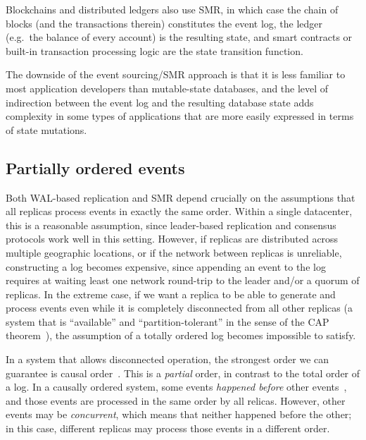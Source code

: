 \documentclass[sigconf,nonacm]{acmart}
\begin{document}
Blockchains and distributed ledgers also use SMR, in which case the chain of blocks (and the transactions therein) constitutes the event log, the ledger (e.g.\ the balance of every account) is the resulting state, and smart contracts or built-in transaction processing logic are the state transition function.

The downside of the event sourcing/SMR approach is that it is less familiar to most application developers than mutable-state databases, and the level of indirection between the event log and the resulting database state adds complexity in some types of applications that are more easily expressed in terms of state mutations.

\subsection{Partially ordered events}\label{sec:partial-order}

Both WAL-based replication and SMR depend crucially on the assumptions that all replicas process events in exactly the same order.
Within a single datacenter, this is a reasonable assumption, since leader-based replication and consensus protocols work well in this setting.
However, if replicas are distributed across multiple geographic locations, or if the network between replicas is unreliable, constructing a log becomes expensive, since appending an event to the log requires at waiting least one network round-trip to the leader and/or a quorum of replicas.
In the extreme case, if we want a replica to be able to generate and process events even while it is completely disconnected from all other replicas (a system that is ``available'' and ``partition-tolerant'' in the sense of the CAP theorem~\cite{Gilbert:2002}), the assumption of a totally ordered log becomes impossible to satisfy.

In a system that allows disconnected operation, the strongest order we can guarantee is causal order~\cite{Attiya:2015}.
This is a \emph{partial} order, in contrast to the total order of a log.
In a causally ordered system, some events \emph{happened before} other events~\cite{Lamport:1978}, and those events are processed in the same order by all relicas.
However, other events may be \emph{concurrent}, which means that neither happened before the other; in this case, different replicas may process those events in a different order.
\end{document}
